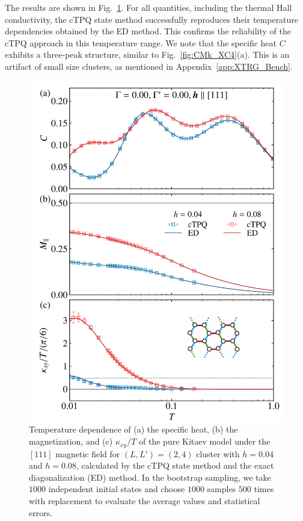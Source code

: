 \documentclass[twocolumn,superscriptaddress,showpacs, longbibliography, aps, prx]{revtex4-2}
\begin{document}
The results are shown in Fig.~\ref{comp_ED}. 
For all quantities, including the thermal Hall conductivity, the cTPQ state method successfully reproduces their temperature dependencies obtained by the ED method. 
This confirms the reliability of the cTPQ approach in this temperature range. 
We note that the specific heat $C$ exhibits a three-peak structure, similar to Fig.~\ref{fig:CMk_XC4}(a). This is an artifact of small size clusters, as mentioned in Appendix~\ref{app:XTRG_Bench}. 

\begin{figure}[t] 
\begin{center} 
\includegraphics[width=\linewidth]{Data_for_figs/plot/fig-20-comp-ED-TPQ.pdf}
\vspace{-0.5cm} 
\caption{Temperature dependence of (a) the specific heat, (b) the magnetization, and (c) $\kappa_{xy}/T$ of the pure Kitaev model under the $[111]$ magnetic field for $(L, L') = (2, 4)$ cluster with $h=0.04$ and $h=0.08$, calculated by the cTPQ state method and the exact diagonalization (ED) method.
In the bootstrap sampling, we take $1000$ independent initial states and choose $1000$ samples $500$ times with replacement to evaluate the average values and statistical errors. 
}
\label{comp_ED}
\end{center}
\end{figure}
\end{document}

